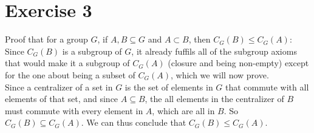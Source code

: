 \documentclass[12pt]{article}
\begin{document}
    \section*{Exercise 3}
    Proof that for a group $G$, if $A, B \subseteq G$ and $A \subset B$,
    then $C_G(B) \leqslant C_G(A)$: \\
    Since $C_G(B)$ is a subgroup of $G$,
    it already fuffils all of the subgroup axioms that would make
    it a subgroup of $C_G(A)$ (closure and being non-empty)
    except for the one about being a subset of $C_G(A)$,
    which we will now prove. \\
    Since a centralizer of a set in $G$ is the set of elements in $G$
    that commute with all elements of that set,
    and since $A \subseteq B$,
    the all elements in the centralizer of $B$ must commute with every
    element in $A$, which are all in $B$.
    So $C_G(B) \subseteq C_G(A)$.
    We can thus conclude that $C_G(B) \leqslant C_G(A)$.
\end{document}
